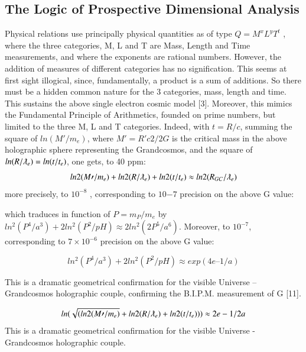 \documentclass[twoside,draft]{article}
\begin{document}
\begin{sloppypar}
{\subsection{The Logic of Prospective Dimensional Analysis}

Physical relations use principally physical quantities as of type $Q = M^{x} L^{y} T^{t}$ , where
the three categories, M, L and T are Mass, Length and Time measurements, and where the exponents are
rational numbers. However, the addition of measures of different categories has no signification.
This seems at first sight illogical, since, fundamentally, a product is a sum of additions. So there
must be a hidden common nature for the 3 categories, mass, length and time. This sustains the
above single electron cosmic model [3]. Moreover, this mimics the Fundamental Principle of
Arithmetics, founded on prime numbers, but limited to the three M, L and T categories. Indeed, with $t =
R/c$, summing the square of $ln(M\prime/m_{e} )$, where $M\prime = R\prime c 2 /2G$ is the critical mass in the above
holographic sphere representing the Grandcosmos, and the square of $ln(R/\lambdabar_{e} ) = ln(t/t_{e} )$, one gets, to
40 ppm:
\begin{equation}
ln 2 (M\prime/m_{e} ) + ln 2 (R/\lambdabar_{e}) + ln 2 (t/t_{e} ) \approx ln 2 (R_{GC} /\lambdabar_{e} )
\end{equation}
more precisely, to $10^{-8}$ , corresponding to $10{-7}$ precision on the above G value:

which traduces in function of $P = m_P/m_e$ by $ln^2(P^4/a^3) + 2 ln^2(P^2/pH) \approx 2 ln^2(2P^5/a^6)$. Moreover, to $10^{-7}$, corresponding to $7 \times 10^{-6}$ precision on the above G value:

\begin{equation}
ln^2(P^4/a^3) + 2 ln^2(P^2/pH) \approx exp(4e – 1/a)
\end{equation}
 
This is a dramatic geometrical confirmation for the visible Universe – Grandcosmos holographic couple, confirming the B.I.P.M. measurement of  G [11].


\begin{equation}
ln(\sqrt{(ln 2 (M\prime/m_{e} )} + ln 2 (R/\lambdabar_{e} ) + ln 2 (t/t_{e} ))) \approx 2e - 1/2a
\end{equation}
This is a dramatic geometrical confirmation for the visible Universe - Grandcosmos holographic
couple.

}
\end{sloppypar}
\end{document}
